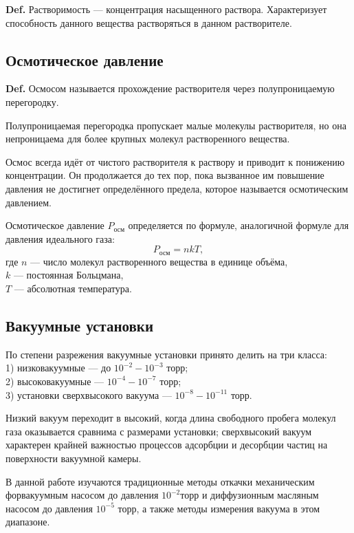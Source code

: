 \documentclass[a4paper,12pt]{article} %
\begin{document}
\textbf{Def.} Растворимость — концентрация насыщенного раствора. Характеризует способность данного вещества растворяться в данном растворителе. 

\subsection*{Осмотическое давление}

\textbf{Def.} Осмосом называется прохождение растворителя через полупроницаемую перегородку. 

Полупроницаемая перегородка пропускает малые молекулы растворителя, но она непроницаема для более крупных молекул растворенного вещества. 

Осмос всегда идёт от чистого растворителя к раствору и приводит к понижению концентрации. Он продолжается до тех пор, пока вызванное им повышение давления не достигнет определённого предела, которое называется осмотическим давлением.

Осмотическое давление $P_{\text{осм}}$ определяется по формуле, аналогичной формуле для давления идеального газа:
\begin{equation}
  P_{\text{осм}} = nkT,
\end{equation}
где $n$ — число молекул растворенного вещества в единице объёма, \\
$k$ — постоянная Больцмана, \\
$T$ — абсолютная температура.

\subsection*{Вакуумные установки}

По степени разрежения вакуумные установки принято делить на три класса: \\
1) низковакуумные — до $10^{-2}-10^{-3}$ торр; \\ 
2) высоковакуумные — $10^{-4}-10^{-7}$ торр; \\ 
3) установки сверхвысокого вакуума — $10^{-8}-10^{-11}$ торр.

Низкий вакуум переходит в высокий, когда длина свободного пробега молекул газа оказывается сравнима с размерами установки; сверхвысокий вакуум характерен крайней важностью процессов адсорбции и десорбции частиц на поверхности вакуумной камеры.

В данной работе изучаются традиционные методы откачки механическим форвакуумным насосом до давления $10^{-2} $торр и диффузионным масляным насосом до давления $10^{-5}$ торр, а также методы измерения вакуума в этом диапазоне.
\end{document}
